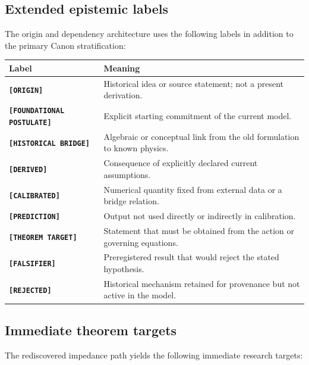 \documentclass[11pt]{article}
\theoremstyle{definition}
\theoremstyle{plain}
\theoremstyle{remark}
\begin{document}
\subsection{Extended epistemic labels}
\label{subsec:extended_epistemic_labels}

The origin and dependency architecture uses the following labels in addition to
the primary Canon stratification:
\begin{center}
\begin{tabularx}{0.94\textwidth}{@{}>{\bfseries}p{}X@{}}
\toprule
Label & Meaning \\
\midrule
\texttt{[ORIGIN]} & Historical idea or source statement; not a present derivation. \\
\texttt{[FOUNDATIONAL POSTULATE]} & Explicit starting commitment of the current model. \\
\texttt{[HISTORICAL BRIDGE]} & Algebraic or conceptual link from the old formulation to known physics. \\
\texttt{[DERIVED]} & Consequence of explicitly declared current assumptions. \\
\texttt{[CALIBRATED]} & Numerical quantity fixed from external data or a bridge relation. \\
\texttt{[PREDICTION]} & Output not used directly or indirectly in calibration. \\
\texttt{[THEOREM TARGET]} & Statement that must be obtained from the action or governing equations. \\
\texttt{[FALSIFIER]} & Preregistered result that would reject the stated hypothesis. \\
\texttt{[REJECTED]} & Historical mechanism retained for provenance but not active in the model. \\
\bottomrule
\end{tabularx}
\end{center}

\subsection{Immediate theorem targets}
\label{subsec:genesis_immediate_theorem_targets}

The rediscovered impedance path yields the following immediate research targets:
\end{document}
